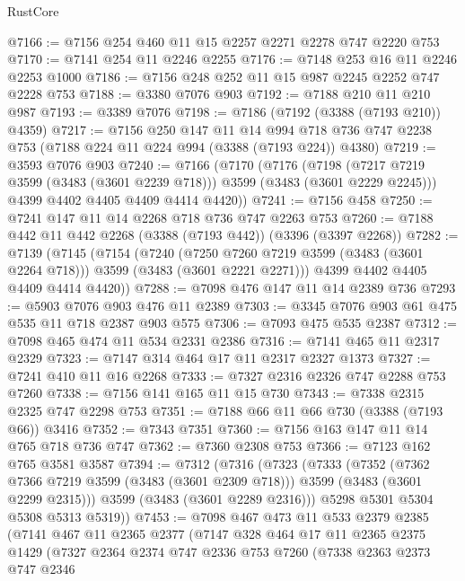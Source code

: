 \begin{lexlean}{RustCore}
\begin{coremodule}
@7166 := @7156 @254 @460 @11 @15 @2257 @2271 @2278 @747 @2220 @753
@7170 := @7141 @254 @11 @2246 @2255
@7176 := @7148 @253 @16 @11 @2246 @2253 @1000
@7186 := @7156 @248 @252 @11 @15 @987 @2245 @2252 @747 @2228 @753
@7188 := @3380 @7076 @903
@7192 := @7188 @210 @11 @210 @987
@7193 := @3389 @7076
@7198 := @7186 (@7192 (@3388 (@7193 @210)) @4359)
@7217 := @7156
    @250
    @147
    @11
    @14
    @994
    @718
    @736
    @747
    @2238
    @753
    (@7188 @224 @11 @224 @994 (@3388 (@7193 @224)) @4380)
@7219 := @3593 @7076 @903
@7240 := @7166
    (@7170
      (@7176
        (@7198 (@7217 @7219 @3599 (@3483 (@3601 @2239 @718))) @3599 (@3483 (@3601 @2229 @2245)))
        @4399
        @4402
        @4405
        @4409
        @4414
        @4420))
@7241 := @7156 @458
@7250 := @7241 @147 @11 @14 @2268 @718 @736 @747 @2263 @753
@7260 := @7188 @442 @11 @442 @2268 (@3388 (@7193 @442)) (@3396 (@3397 @2268))
@7282 := @7139
    (@7145
      (@7154
        (@7240
          (@7250 @7260 @7219 @3599 (@3483 (@3601 @2264 @718)))
          @3599
          (@3483 (@3601 @2221 @2271)))
        @4399
        @4402
        @4405
        @4409
        @4414
        @4420))
@7288 := @7098 @476 @147 @11 @14 @2389 @736
@7293 := @5903 @7076 @903 @476 @11 @2389
@7303 := @3345 @7076 @903 @61 @475 @535 @11 @718 @2387 @903 @575
@7306 := @7093 @475 @535 @2387
@7312 := @7098 @465 @474 @11 @534 @2331 @2386
@7316 := @7141 @465 @11 @2317 @2329
@7323 := @7147 @314 @464 @17 @11 @2317 @2327 @1373
@7327 := @7241 @410 @11 @16 @2268
@7333 := @7327 @2316 @2326 @747 @2288 @753 @7260
@7338 := @7156 @141 @165 @11 @15 @730
@7343 := @7338 @2315 @2325 @747 @2298 @753
@7351 := @7188 @66 @11 @66 @730 (@3388 (@7193 @66)) @3416
@7352 := @7343 @7351
@7360 := @7156 @163 @147 @11 @14 @765 @718 @736 @747
@7362 := @7360 @2308 @753
@7366 := @7123 @162 @765 @3581 @3587
@7394 := @7312
    (@7316
      (@7323
        (@7333
          (@7352
            (@7362 @7366 @7219 @3599 (@3483 (@3601 @2309 @718)))
            @3599
            (@3483 (@3601 @2299 @2315)))
          @3599
          (@3483 (@3601 @2289 @2316)))
        @5298
        @5301
        @5304
        @5308
        @5313
        @5319))
@7453 := @7098
    @467
    @473
    @11
    @533
    @2379
    @2385
    (@7141
      @467
      @11
      @2365
      @2377
      (@7147
        @328
        @464
        @17
        @11
        @2365
        @2375
        @1429
        (@7327
          @2364
          @2374
          @747
          @2336
          @753
          @7260
          (@7338
            @2363
            @2373
            @747
            @2346

\end{coremodule}
\end{lexlean}
